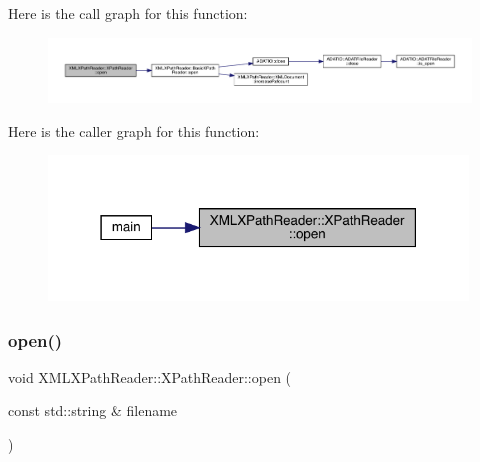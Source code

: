 Here is the call graph for this function\+:
\nopagebreak
\begin{figure}[H]
\begin{center}
\leavevmode
\includegraphics[width=350pt]{d3/d5a/classXMLXPathReader_1_1XPathReader_aa6e237582bcd20389d60cb29a879890c_cgraph}
\end{center}
\end{figure}
Here is the caller graph for this function\+:\nopagebreak
\begin{figure}[H]
\begin{center}
\leavevmode
\includegraphics[width=316pt]{d3/d5a/classXMLXPathReader_1_1XPathReader_aa6e237582bcd20389d60cb29a879890c_icgraph}
\end{center}
\end{figure}
\mbox{\label{classXMLXPathReader_1_1XPathReader_aa6e237582bcd20389d60cb29a879890c}} 
\subsubsection{\texorpdfstring{open()}{open()}\hspace{0.1cm}{\footnotesize\ttfamily [2/6]}}
{\footnotesize\ttfamily void X\+M\+L\+X\+Path\+Reader\+::\+X\+Path\+Reader\+::open (\begin{DoxyParamCaption}\item[{const std\+::string \&}]{filename }\end{DoxyParamCaption})\hspace{0.3cm}{\ttfamily [inline]}}

